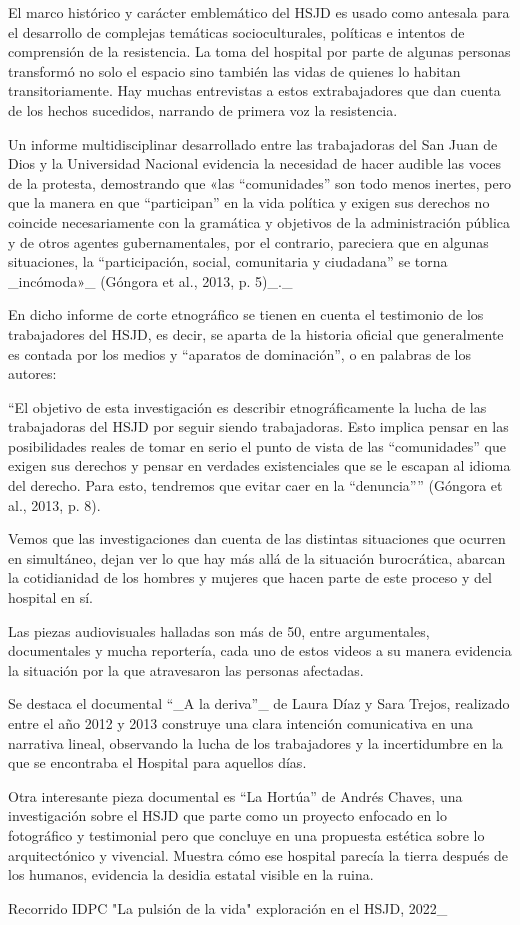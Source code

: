 El marco histórico y carácter emblemático del HSJD es usado como antesala para el desarrollo de complejas temáticas socioculturales, políticas e intentos de comprensión de la resistencia. La toma del hospital por parte de algunas personas transformó no solo el espacio sino también las vidas de quienes lo habitan transitoriamente. Hay muchas entrevistas a estos extrabajadores que dan cuenta de los hechos sucedidos, narrando de primera voz la resistencia.

Un informe multidisciplinar desarrollado entre las trabajadoras del San Juan de Dios y la Universidad Nacional evidencia la necesidad de hacer audible las voces de la protesta, demostrando que «las “comunidades” son todo menos inertes, pero que la manera en que “participan” en la vida política y exigen sus derechos no coincide necesariamente con la gramática y objetivos de la administración pública y de otros agentes gubernamentales, por el contrario, pareciera que en algunas situaciones, la “participación, social, comunitaria y ciudadana” se torna _incómoda»_ (Góngora et al., 2013, p. 5)_._

En dicho informe de corte etnográfico se tienen en cuenta el testimonio de los trabajadores del HSJD, es decir, se aparta de la historia oficial que generalmente es contada por los medios y “aparatos de dominación”, o en palabras de los autores:

“El objetivo de esta investigación es describir etnográficamente la lucha de las trabajadoras del HSJD por seguir siendo trabajadoras. Esto implica pensar en las posibilidades reales de tomar en serio el punto de vista de las “comunidades” que exigen sus derechos y pensar en verdades existenciales que se le escapan al idioma del derecho. Para esto, tendremos que evitar caer en la “denuncia”” (Góngora et al., 2013, p. 8).

Vemos que las investigaciones dan cuenta de las distintas situaciones que ocurren en simultáneo, dejan ver lo que hay más allá de la situación burocrática, abarcan la cotidianidad de los hombres y mujeres que hacen parte de este proceso y del hospital en sí.

Las piezas audiovisuales halladas son más de 50, entre argumentales, documentales y mucha reportería, cada uno de estos videos a su manera evidencia la situación por la que atravesaron las personas afectadas.

Se destaca el documental “_A la deriva”_ de Laura Díaz y Sara Trejos, realizado entre el año 2012 y 2013 construye una clara intención comunicativa en una narrativa lineal, observando la lucha de los trabajadores y la incertidumbre en la que se encontraba el Hospital para aquellos días.

Otra interesante pieza documental es “La Hortúa” de Andrés Chaves, una investigación sobre el HSJD que parte como un proyecto enfocado en lo fotográfico y testimonial pero que concluye en una propuesta estética sobre lo arquitectónico y vivencial. Muestra cómo ese hospital parecía la tierra después de los humanos, evidencia la desidia estatal visible en la ruina.

 Recorrido IDPC "La pulsión de la vida" exploración en el HSJD, 2022_